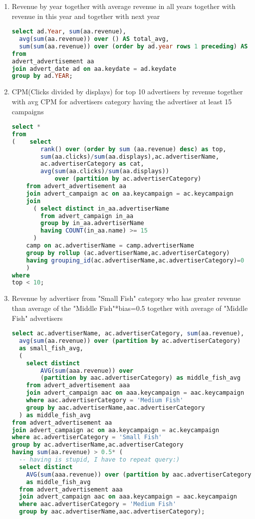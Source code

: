 \begin{enumerate}
\item    Revenue by year together with average revenue in all years together with revenue in this year and together with next year
\begin{lstlisting}[language=sql] 
select ad.Year, sum(aa.revenue), 
  avg(sum(aa.revenue)) over () AS total_avg,
  sum(sum(aa.revenue)) over (order by ad.year rows 1 preceding) AS sum_last_2_years
from   
advert_advertisement aa
join advert_date ad on aa.keydate = ad.keydate
group by ad.YEAR;
  \end{lstlisting}
\item    CPM(Clicks divided by displays) for top 10 advertisers by revenue together with avg CPM for advertisers category having the advertiser at least 15 campaigns
  \begin{lstlisting}[language=sql] 
select *
from 
(    select
        rank() over (order by sum (aa.revenue) desc) as top,
        sum(aa.clicks)/sum(aa.displays),ac.advertiserName,
        ac.advertiserCategory as cat, 
        avg(sum(aa.clicks)/sum(aa.displays)) 
            over (partition by ac.advertiserCategory)
    from advert_advertisement aa
    join advert_campaign ac on aa.keycampaign = ac.keycampaign
    join
      ( select distinct in_aa.advertiserName 
        from advert_campaign in_aa
        group by in_aa.advertiserName
        having COUNT(in_aa.name) >= 15
      )
    camp on ac.advertiserName = camp.advertiserName
    group by rollup (ac.advertiserName,ac.advertiserCategory) 
    having grouping_id(ac.advertiserName,ac.advertiserCategory)=0
    )
where 
top < 10;
\end{lstlisting}
\item Revenue by advertiser from "Small Fish" category who has greater revenue than average of the "Middle Fish"*bias=0.5 together with average of "Middle Fish" advertisers  
  \begin{lstlisting}[language=sql] 
select ac.advertiserName, ac.advertiserCategory, sum(aa.revenue), 
  avg(sum(aa.revenue)) over (partition by ac.advertiserCategory) 
  as small_fish_avg,
  ( 
    select distinct
        AVG(sum(aaa.revenue)) over 
        (partition by aac.advertiserCategory) as middle_fish_avg
    from advert_advertisement aaa 
    join advert_campaign aac on aaa.keycampaign = aac.keycampaign
    where aac.advertiserCategory = 'Medium Fish'   
    group by aac.advertiserName,aac.advertiserCategory
  ) as middle_fish_avg
from advert_advertisement aa
join advert_campaign ac on aa.keycampaign = ac.keycampaign
where ac.advertiserCategory = 'Small Fish'
group by ac.advertiserName,ac.advertiserCategory
having sum(aa.revenue) > 0.5* (
  -- having is stupid, I have to repeat query:)
  select distinct
    AVG(sum(aaa.revenue)) over (partition by aac.advertiserCategory) 
    as middle_fish_avg
  from advert_advertisement aaa 
  join advert_campaign aac on aaa.keycampaign = aac.keycampaign
  where aac.advertiserCategory = 'Medium Fish'   
  group by aac.advertiserName,aac.advertiserCategory);


\end{lstlisting}
\end{enumerate}
